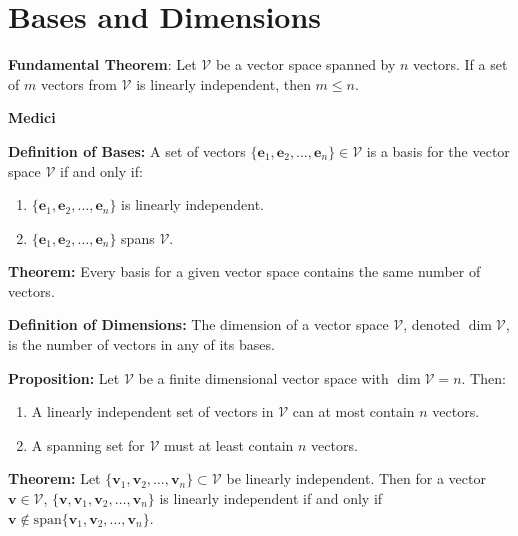 \documentclass{article}
\newcommand{\spann}[1]{\mathrm{span}\{#1\}}
\begin{document}
    \section{Bases and Dimensions}
    \begin{theorem}
        \textbf{Fundamental Theorem}: Let $\mathcal{V}$ be a vector space spanned by $n$ vectors. If a set of $m$ vectors from $\mathcal{V}$ is linearly independent, then $m \le n$.
    \end{theorem}
    \begin{minipage}[t]{.45\textwidth} %
        \begin{center}
            \textbf{Medici}
        \end{center}
        \textbf{Definition of Bases:} A set of vectors $\{\bm{e}_1,\bm{e}_2,\dots,\bm{e}_n\} \in \mathcal{V}$ is a basis for the vector space $\mathcal{V}$ if and only if:
        \begin{enumerate}
            \item $\{\bm{e}_1,\bm{e}_2,\dots,\bm{e}_n\}$ is linearly independent.
            \item $\{\bm{e}_1,\bm{e}_2,\dots,\bm{e}_n\}$ spans $\mathcal{V}$.
        \end{enumerate}
        \vspace{2mm}

        \textbf{Theorem:} Every basis for a given vector space contains the same number of vectors.
        \vspace{2mm}

        \textbf{Definition of Dimensions:} The dimension of a vector space $\mathcal{V}$, denoted $\dim \mathcal{V}$, is the number of vectors in any of its bases.
        \vspace{2mm}

        \textbf{Proposition:} Let $\mathcal{V}$ be a finite dimensional vector space with $\dim \mathcal{V} = n$. Then:
        \begin{enumerate}
            \item A linearly independent set of vectors in $\mathcal{V}$ can at most contain $n$ vectors.
            \item A spanning set for $\mathcal{V}$ must at least contain $n$ vectors.
        \end{enumerate}
        \vspace{2mm}

        \textbf{Theorem:} Let $\{\bm{v}_1,\bm{v}_2,\dots,\bm{v}_n\} \subset \mathcal{V}$ be linearly independent. Then for a vector $\bm{v} \in \mathcal{V}$, $\{\bm{v}, \bm{v}_1,\bm{v}_2,\dots,\bm{v}_n\}$ is linearly independent if and only if $\bm{v} \notin \spann{\bm{v}_1,\bm{v}_2,\dots,\bm{v}_n}$.
        \vspace{2mm}


\end{minipage}
\end{document}
